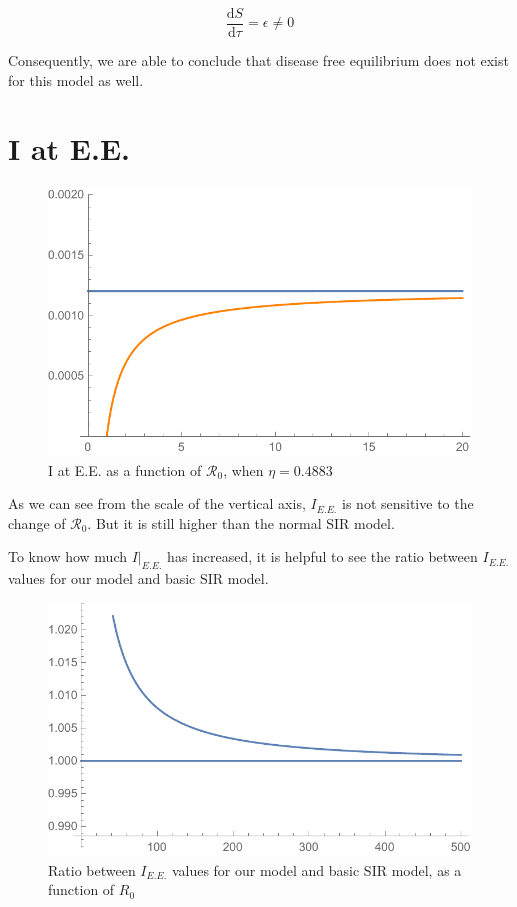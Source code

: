 \documentclass[12pt]{article}
\newcommand\dbyd[2]{\frac{\mathrm d{#1}}{\mathrm d{#2}}}
\newcommand{\R}{\mathcal{R}}
\begin{document}
\begin{equation}
\dbyd{S}{\tau}=\epsilon\neq0
\end{equation}

Consequently, we are able to conclude that disease free equilibrium does not exist for this model as well.

\section{I at E.E.}

\begin{figure}[H]
  \caption{I at E.E. as a function of $\R_0$, when $\eta=0.4883$}
  \includegraphics[width=1\textwidth]{Figures/Plot_I_at_EE_vary_R_0.pdf}
\end{figure}

As we can see from the scale of the vertical axis, $I_{E.E.}$ is not sensitive to the change of $\R_0$. But it is still higher than the normal SIR model.

To know how much $I|_{E.E.}$ has increased, it is helpful to see the ratio between $I_{E.E.}$ values for our model and basic SIR model.

\begin{figure}[H]
  \caption{Ratio between $I_{E.E.}$ values for our model and basic SIR model, as a function of $R_0$}
  \includegraphics[width=1\textwidth]{Figures/Ratio_plot.pdf}
\end{figure}
\end{document}
